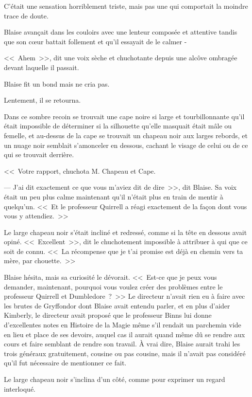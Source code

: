 C'était une sensation horriblement triste, mais pas une qui comportait la moindre trace de doute.


Blaise avançait dans les couloirs avec une lenteur composée et attentive tandis que son cœur battait follement et qu'il essayait de le calmer -

<<~Ahem~>>, dit une voix sèche et chuchotante depuis une alcôve ombragée devant laquelle il passait.

Blaise fit un bond mais ne cria pas.

Lentement, il se retourna.

Dans ce sombre recoin se trouvait une cape noire si large et tourbillonnante qu'il était impossible de déterminer si la silhouette qu'elle masquait était mâle ou femelle, et au-dessus de la cape se trouvait un chapeau noir aux larges rebords, et un nuage noir semblait s'amonceler en dessous, cachant le visage de celui ou de ce qui se trouvait derrière.

<<~Votre rapport, chuchota M. Chapeau et Cape.

--- J'ai dit exactement ce que vous m'aviez dit de dire~>>, dit Blaise. Sa voix était un peu plus calme maintenant qu'il n'était plus en train de mentir à quelqu'un. <<~Et le professeur Quirrell a réagi exactement de la façon dont vous vous y attendiez.~>>

Le large chapeau noir s'était incliné et redressé, comme si la tête en dessous avait opiné. <<~Excellent~>>, dit le chuchotement impossible à attribuer à qui que ce soit de connu. <<~La récompense que je t'ai promise est déjà en chemin vers ta mère, par chouette.~>>

Blaise hésita, mais sa curiosité le dévorait. <<~Est-ce que je peux vous demander, maintenant, pourquoi vous voulez créer des problèmes entre le professeur Quirrell et Dumbledore~?~>> Le directeur n'avait rien eu à faire avec les brutes de Gryffondor dont Blaise avait entendu parler, et en plus d'aider Kimberly, le directeur avait proposé que le professeur Binns lui donne d'excellentes notes en Histoire de la Magie même s'il rendait un parchemin vide en lieu et place de ses devoirs, auquel cas il aurait quand même dû se rendre aux cours et faire semblant de rendre son travail. À vrai dire, Blaise aurait trahi les trois généraux gratuitement, cousine ou pas cousine, mais il n'avait pas considéré qu'il fut nécessaire de mentionner ce fait.

Le large chapeau noir s'inclina d'un côté, comme pour exprimer un regard interloqué.

